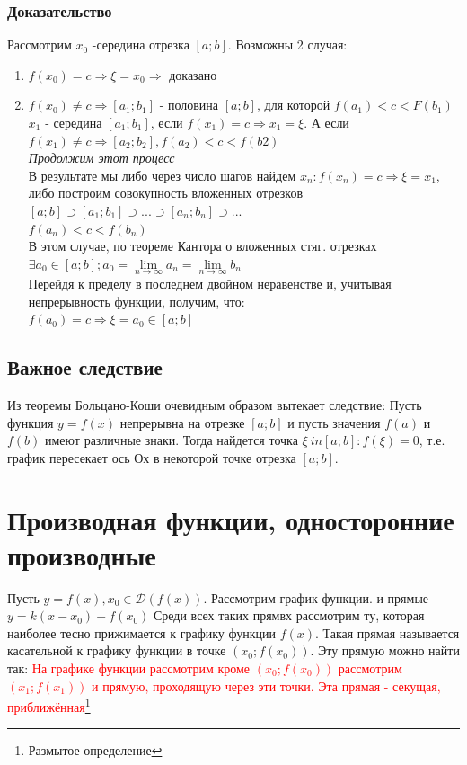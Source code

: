 \documentclass[oneside]{book}
\begin{document}
\subsection{Доказательство}
Рассмотрим $x_0$ -середина отрезка $[a;b]$. Возможны 2 случая:
\begin{enumerate}
\item $f(x_0)=c \Rightarrow \xi=x_0 \Rightarrow$ доказано
\item $f(x_0)\neq c \Rightarrow [a_1;b_1]$ - половина $[a;b]$, для которой $f(a_1)<c<F(b_1)$
$x_1$ - середина $[a_1;b_1]$, если $f(x_1)=c\Rightarrow x_1=\xi$. А если $f(x_1)\neq c \Rightarrow [a_2; b_2], f(a_2)<c<f(b2)$
\\\textit{Продолжим этот процесс}\\
В результате мы либо через число шагов найдем $x_n:f(x_n)=c\Rightarrow \xi=x_1$, либо построим совокупность вложенных отрезков $[a;b]\supset[a_1;b_1]\supset...\supset[a_n;b_n]\supset...$\\
$f(a_n)<c<f(b_n)$\\
В этом случае, по теореме Кантора о вложенных стяг. отрезках $\exists a_0 \in [a;b]; a_0=\lim \limits_{n \rightarrow \infty}a_n=\lim \limits_{n \rightarrow \infty}b_n$\\
Перейдя к пределу в последнем двойном неравенстве и, учитывая непрерывность функции, получим, что:\\
$f(a_0)=c\Rightarrow \xi=a_0 \in [a;b]$
\end{enumerate}
\section{Важное следствие}
Из теоремы Больцано-Коши очевидным образом вытекает следствие:
Пусть функция $y=f(x)$ непрерывна на отрезке $[a;b]$ и пусть значения $f(a)$ и $f(b)$ имеют различные знаки. Тогда найдется точка $\xi \ in [a;b]: f(\xi)=0$, т.е. график пересекает ось Ох в некоторой точке отрезка $[a;b]$.

\setcounter{chapter}{16}
\chapter{Производная функции, односторонние производные}

Пусть $y = f(x), x_0 \in \mathcal{D}(f(x))$. Рассмотрим график функции. и  прямые $y = k(x - x_0) + f(x_0)$
Среди всех таких прямвх рассмотрим ту, которая наиболее тесно прижимается к графику функции $f(x)$.
Такая прямая называется касательной к графику функции в точке $(x_0; f(x_0))$. Эту прямую можно найти так:
\textcolor{red}{На графике функции рассмотрим кроме $(x_0; f(x_0))$ рассмотрим $(x_1; f(x_1))$ и прямую, проходящую через эти точки. Эта прямая - секущая, приближённая\footnote{Размытое определение}}
\end{document}
